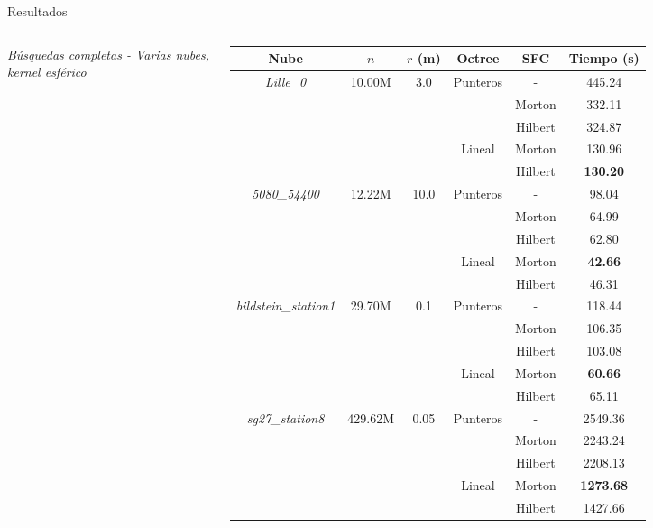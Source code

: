 \documentclass[aspectratio=169]{beamer}
\begin{document}
\begin{frame}{Resultados}
    \begin{columns}
    \textit{Búsquedas completas - Varias nubes, kernel esférico}
    \vspace{-0.5em} 
        \begin{table}
            \scriptsize
            \begin{tabular}{|c|c|c|ccc|}
            \hline
            Nube                      & $n$                    & $r$ (m)                  & Octree                    & SFC     & Tiempo (s)\\ \hline
            \multirow{5}{*}{\textit{Lille\_0}} & \multirow{5}{*}{10.00M} & \multirow{5}{*}{3.0} & \multirow{3}{*}{Punteros} & - & 445.24 \\
            &  &  &  & Morton & 332.11 \\
            &  &  &  & Hilbert & 324.87 \\ \cline{4-6}
            &  &  & \multirow{2}{*}{Lineal} & Morton & 130.96 \\
            &  &  &  & Hilbert & \textbf{130.20} \\
            \hline
            \multirow{5}{*}{\textit{5080\_54400}} & \multirow{5}{*}{12.22M} & \multirow{5}{*}{10.0} & \multirow{3}{*}{Punteros} & - & 98.04 \\
            &  &  &  & Morton & 64.99 \\
            &  &  &  & Hilbert & 62.80 \\ \cline{4-6}
            &  &  & \multirow{2}{*}{Lineal} & Morton & \textbf{42.66} \\
            &  &  &  & Hilbert & 46.31 \\
            \hline
            \multirow{5}{*}{\textit{bildstein\_station1}} & \multirow{5}{*}{29.70M} & \multirow{5}{*}{0.1} & \multirow{3}{*}{Punteros} & - & 118.44 \\
            &  &  &  & Morton & 106.35 \\
            &  &  &  & Hilbert & 103.08 \\ \cline{4-6}
            &  &  & \multirow{2}{*}{Lineal} & Morton & \textbf{60.66} \\
            &  &  &  & Hilbert & 65.11 \\
            \hline
            \multirow{5}{*}{\textit{sg27\_station8}} & \multirow{5}{*}{429.62M} & \multirow{5}{*}{0.05} & \multirow{3}{*}{Punteros} & - & 2549.36 \\
            &  &  &  & Morton & 2243.24 \\
            &  &  &  & Hilbert & 2208.13 \\ \cline{4-6}
            &  &  & \multirow{2}{*}{Lineal} & Morton & \textbf{1273.68} \\
            &  &  &  & Hilbert & 1427.66 \\
            \hline
            \end{tabular}
        \end{table}
    \end{columns}
\end{frame}
\end{document}
